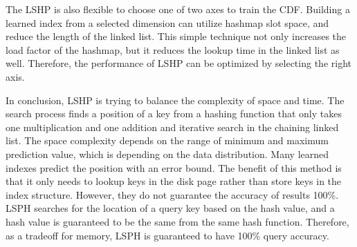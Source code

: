 The LSHP is also flexible to choose one of two axes to train the CDF. Building a learned index from a selected dimension can utilize hashmap slot space, and reduce the length of the linked list. This simple technique not only increases the load factor of the hashmap, but it reduces the lookup time in the linked list as well. Therefore, the performance of LSHP can be optimized by selecting the right axis. 

In conclusion, LSHP is trying to balance the complexity of space and time. The search process finds a position of a key from a hashing function that only takes one multiplication and one addition and iterative search in the chaining linked list. The space complexity depends on the range of minimum and maximum prediction value, which is depending on the data distribution. Many learned indexes predict the position with an error bound. The benefit of this method is that it only needs to lookup keys in the disk page rather than store keys in the index structure. However,  they do not guarantee the accuracy of results 100\%. LSPH searches for the location of a query key based on the hash value, and a hash value is guaranteed to be the same from the same hash function. Therefore, as a tradeoff for memory, LSPH is guaranteed to have 100\% query accuracy. 


